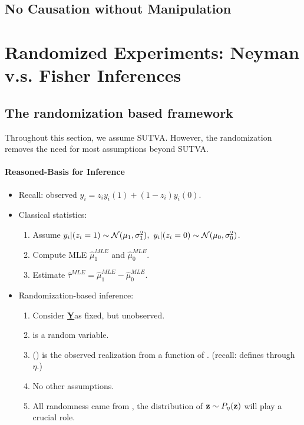 \documentclass[11pt]{article}
\newcommand{\science}[0]{\underline{\textbf{Y}}}
\begin{document}
	\subsection{No Causation without Manipulation}
	
	\section{Randomized Experiments: Neyman v.s. Fisher Inferences}
	\subsection{The randomization based framework}
	\par Throughout this section, we assume SUTVA. However, the randomization removes the need for most assumptions beyond SUTVA.
	\paragraph{Reasoned-Basis for Inference}
	\begin{itemize}
		\item Recall: observed $y_i = z_i y_i(1) + (1-z_i) y_i(0)$.
		\item Classical statistics:
		\begin{enumerate}
			\item Assume $y_i|(z_i=1) \sim \mathcal{{N}}(\mu_1, \sigma_1^2),\ y_i|(z_i=0) \sim \mathcal{{N}}(\mu_0, \sigma_0^2)$.
			\item Compute MLE $\hat{\mu}_1^{MLE}$ and $\hat{\mu}_0^{MLE}$.
			\item Estimate $\hat{\tau}^{MLE} = \hat{\mu}_1^{MLE} - \hat{\mu}_0^{MLE}$.
		\end{enumerate}
		\item Randomization-based inference:
		\begin{enumerate}
			\item Consider \science as fixed, but unobserved.
			\item \vez is a random variable.
			\item \vey(\vez) is the observed realization from a function of \vez. (recall: \vez defines \vey through $\eta$.)
			\item No other assumptions.
			\item All randomness came from \vez, the distribution of $\textbf{z} \sim P_\eta(\textbf{z})$ will play a crucial role.
		\end{enumerate}
	\end{itemize}
	
\end{document}
